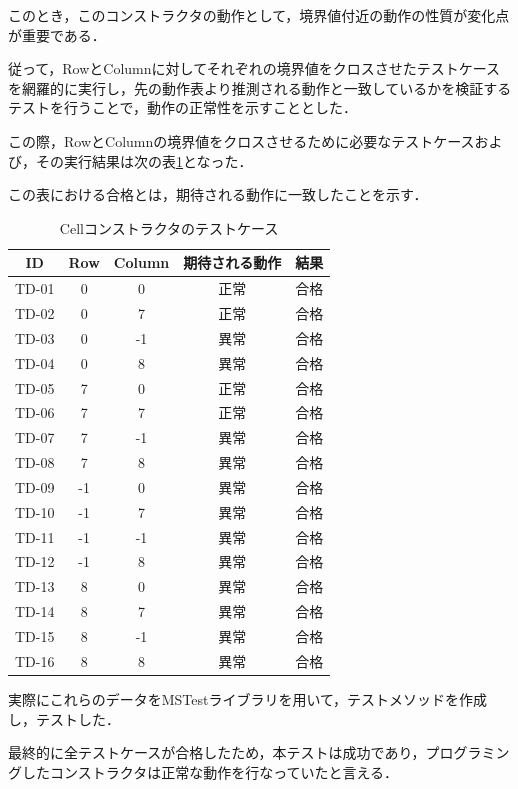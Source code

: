 \documentclass[platex,dvipdfmx,12pt]{jsarticle}
\begin{document}
このとき，このコンストラクタの動作として，境界値付近の動作の性質が変化点が重要である．

従って，RowとColumnに対してそれぞれの境界値をクロスさせたテストケースを網羅的に実行し，先の動作表より推測される動作と一致しているかを検証する
テストを行うことで，動作の正常性を示すこととした．

この際，RowとColumnの境界値をクロスさせるために必要なテストケースおよび，その実行結果は次の表\ref{tab:enshu5-cell-const-tds}となった．

この表における合格とは，期待される動作に一致したことを示す．

\begin{table}[H]
  \centering
  \caption{Cellコンストラクタのテストケース}
  \label{tab:enshu5-cell-const-tds}
  \begin{tabular}{ccccc}
    ID & Row & Column & 期待される動作 & 結果 \\
    \hline
    TD-01 & 0  & 0  & 正常 & 合格 \\
    TD-02 & 0  & 7  & 正常 & 合格 \\
    TD-03 & 0  & -1 & 異常 & 合格 \\
    TD-04 & 0  & 8  & 異常 & 合格 \\
    TD-05 & 7  & 0  & 正常 & 合格 \\
    TD-06 & 7  & 7  & 正常 & 合格 \\
    TD-07 & 7  & -1 & 異常 & 合格 \\
    TD-08 & 7  & 8  & 異常 & 合格 \\
    TD-09 & -1 & 0  & 異常 & 合格 \\
    TD-10 & -1 & 7  & 異常 & 合格 \\
    TD-11 & -1 & -1 & 異常 & 合格 \\
    TD-12 & -1 & 8  & 異常 & 合格 \\
    TD-13 & 8  & 0  & 異常 & 合格 \\
    TD-14 & 8  & 7  & 異常 & 合格 \\
    TD-15 & 8  & -1 & 異常 & 合格 \\
    TD-16 & 8  & 8  & 異常 & 合格 \\
  \end{tabular}
\end{table}

実際にこれらのデータをMSTestライブラリを用いて，テストメソッドを作成し，テストした．

最終的に全テストケースが合格したため，本テストは成功であり，プログラミングしたコンストラクタは正常な動作を行なっていたと言える．
\end{document}
